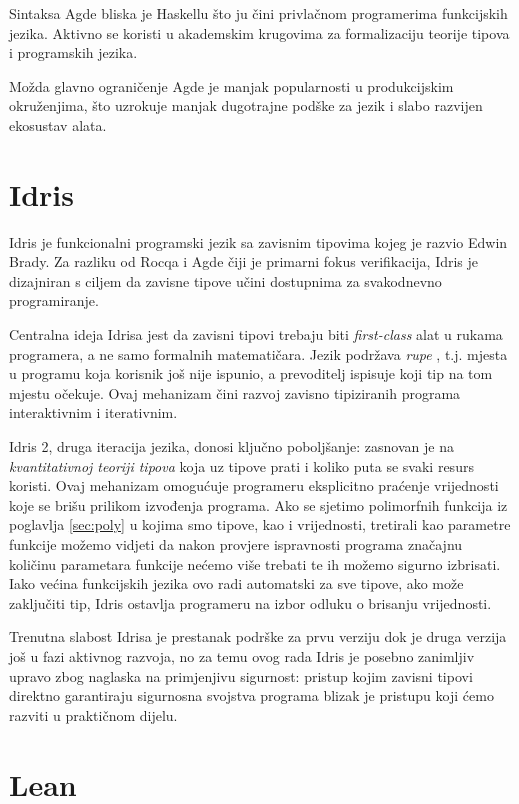 \documentclass[diplomskirad,upload]{fer}
\begin{document}
Sintaksa Agde bliska je Haskellu što ju čini privlačnom programerima
funkcijskih jezika. Aktivno se koristi u akademskim krugovima za formalizaciju
teorije tipova i programskih jezika.

Možda glavno ograničenje Agde je manjak popularnosti u produkcijskim
okruženjima, što uzrokuje manjak dugotrajne podške za jezik i slabo razvijen
ekosustav alata.

\section{Idris}

Idris \cite{idris} je funkcionalni programski jezik sa zavisnim tipovima
kojeg je razvio Edwin Brady. Za razliku od Rocqa i Agde čiji je primarni fokus
verifikacija, Idris je dizajniran s ciljem da zavisne tipove učini dostupnima
za svakodnevno programiranje.

Centralna ideja Idrisa jest da zavisni tipovi trebaju biti \emph{first-class}
alat u rukama programera, a ne samo formalnih matematičara. Jezik podržava
\emph{rupe} , t.j. mjesta u programu koja korisnik još nije ispunio,
a prevoditelj ispisuje koji tip na tom mjestu očekuje. Ovaj mehanizam čini
razvoj zavisno tipiziranih programa interaktivnim i iterativnim.

Idris 2, druga iteracija jezika, donosi ključno poboljšanje:
zasnovan je na \emph{kvantitativnoj teoriji tipova}  koja uz tipove prati i koliko puta se svaki resurs koristi.
Ovaj mehanizam omogućuje programeru eksplicitno praćenje vrijednosti koje se
brišu prilikom izvođenja programa. Ako se sjetimo polimorfnih funkcija iz
poglavlja \ref{sec:poly} u kojima smo tipove, kao i vrijednosti, tretirali kao
parametre funkcije možemo vidjeti da nakon provjere ispravnosti programa
značajnu količinu parametara funkcije nećemo više trebati te ih možemo sigurno
izbrisati. Iako većina funkcijskih jezika ovo radi automatski za sve tipove, ako
može zaključiti tip, Idris ostavlja programeru na izbor odluku o brisanju
vrijednosti.

Trenutna slabost Idrisa je prestanak podrške za prvu verziju dok je druga
verzija još u fazi aktivnog razvoja, no za temu ovog rada Idris je posebno
zanimljiv upravo zbog naglaska na primjenjivu sigurnost: pristup kojim zavisni
tipovi direktno garantiraju sigurnosna svojstva programa blizak je pristupu
koji ćemo razviti u praktičnom dijelu.

\section{Lean}
\end{document}
